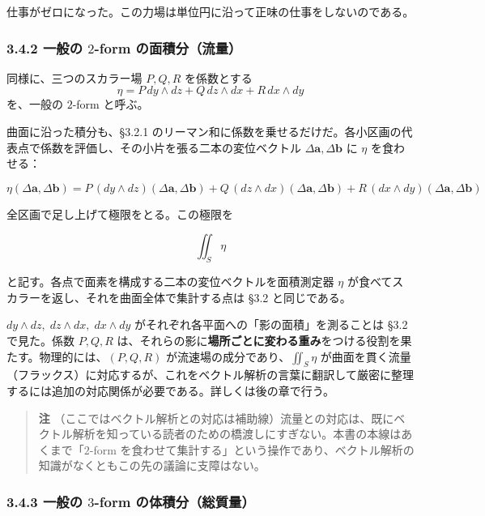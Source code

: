 \documentclass[a4paper,12pt,openany]{book}
\begin{document}
仕事がゼロになった。この力場は単位円に沿って正味の仕事をしないのである。

\hypertarget{ux4e00ux822cux306e-2-form-ux306eux9762ux7a4dux5206ux6d41ux91cf}{%
\subsubsection{\texorpdfstring{3.4.2 一般の \(2\)-form
の面積分（流量）}{3.4.2 一般の 2-form の面積分（流量）}}\label{ux4e00ux822cux306e-2-form-ux306eux9762ux7a4dux5206ux6d41ux91cf}}

同様に、三つのスカラー場 \(P,Q,R\) を係数とする \[
\eta = P\,dy \wedge dz + Q\,dz \wedge dx + R\,dx \wedge dy
\] を、一般の \(2\)-form と呼ぶ。

曲面に沿った積分も、§3.2.1
のリーマン和に係数を乗せるだけだ。各小区画の代表点で係数を評価し、その小片を張る二本の変位ベクトル
\(\Delta\mathbf{a},\Delta\mathbf{b}\) に \(\eta\) を食わせる：

\[\eta(\Delta\mathbf{a},\Delta\mathbf{b})
= P\,(dy \wedge dz)(\Delta\mathbf{a},\Delta\mathbf{b})
{}+ Q\,(dz \wedge dx)(\Delta\mathbf{a},\Delta\mathbf{b})
{}+ R\,(dx \wedge dy)(\Delta\mathbf{a},\Delta\mathbf{b})\]

全区画で足し上げて極限をとる。この極限を

\[\iint_S \eta\]

と記す。各点で面素を構成する二本の変位ベクトルを面積測定器 \(\eta\)
が食べてスカラーを返し、それを曲面全体で集計する点は §3.2 と同じである。

\(dy \wedge dz,\; dz \wedge dx,\; dx \wedge dy\)
がそれぞれ各平面への「影の面積」を測ることは §3.2 で見た。係数
\(P, Q, R\)
は、それらの影に\textbf{場所ごとに変わる重み}をつける役割を果たす。物理的には、\((P, Q, R)\)
が流速場の成分であり、\(\iint_S \eta\)
が曲面を貫く流量（フラックス）に対応するが、これをベクトル解析の言葉に翻訳して厳密に整理するには追加の対応関係が必要である。詳しくは後の章で行う。

\begin{quote}
\textbf{注}
（ここではベクトル解析との対応は補助線）流量との対応は、既にベクトル解析を知っている読者のための橋渡しにすぎない。本書の本線はあくまで「\(2\)-form
を食わせて集計する」という操作であり、ベクトル解析の知識がなくともこの先の議論に支障はない。
\end{quote}

\hypertarget{ux4e00ux822cux306e-3-form-ux306eux4f53ux7a4dux5206ux7dcfux8ceaux91cf}{%
\subsubsection{\texorpdfstring{3.4.3 一般の \(3\)-form
の体積分（総質量）}{3.4.3 一般の 3-form の体積分（総質量）}}\label{ux4e00ux822cux306e-3-form-ux306eux4f53ux7a4dux5206ux7dcfux8ceaux91cf}}
\end{document}
